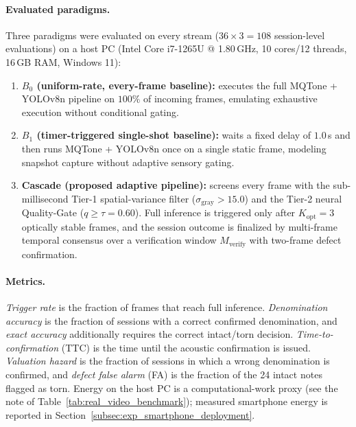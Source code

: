 \documentclass[final,5p,times,twocolumn,authoryear]{elsarticle}
\begin{document}
\paragraph{Evaluated paradigms.}
Three paradigms were evaluated on every stream ($36 \times 3 = 108$ session-level evaluations) on a host PC (Intel Core i7-1265U @ 1.80\,GHz, 10 cores/12 threads, 16\,GB RAM, Windows 11):
\begin{enumerate}[label=(\roman*)]
    \item \textbf{$B_0$ (uniform-rate, every-frame baseline):} executes the full MQTone + YOLOv8n pipeline on $100\%$ of incoming frames, emulating exhaustive execution without conditional gating.
    \item \textbf{$B_1$ (timer-triggered single-shot baseline):} waits a fixed delay of $1.0$\,s and then runs MQTone + YOLOv8n once on a single static frame, modeling snapshot capture without adaptive sensory gating.
    \item \textbf{Cascade (proposed adaptive pipeline):} screens every frame with the sub-millisecond Tier-1 spatial-variance filter ($\sigma_{\text{gray}} > 15.0$) and the Tier-2 neural Quality-Gate ($q \ge \tau = 0.60$). Full inference is triggered only after $K_{\text{opt}} = 3$ optically stable frames, and the session outcome is finalized by multi-frame temporal consensus over a verification window $M_{\text{verify}}$ with two-frame defect confirmation.
\end{enumerate}

\paragraph{Metrics.}
\emph{Trigger rate} is the fraction of frames that reach full inference. \emph{Denomination accuracy} is the fraction of sessions with a correct confirmed denomination, and \emph{exact accuracy} additionally requires the correct intact/torn decision. \emph{Time-to-confirmation} (TTC) is the time until the acoustic confirmation is issued. \emph{Valuation hazard} is the fraction of sessions in which a wrong denomination is confirmed, and \emph{defect false alarm} (FA) is the fraction of the 24 intact notes flagged as torn. Energy on the host PC is a computational-work proxy (see the note of Table~\ref{tab:real_video_benchmark}); measured smartphone energy is reported in Section~\ref{subsec:exp_smartphone_deployment}.
\end{document}
